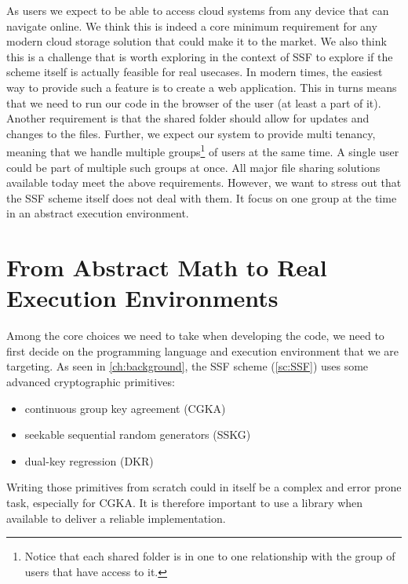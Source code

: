 As users we expect to be able to access 
cloud systems from any device that can navigate online.
We think this is indeed a core minimum requirement for any modern
cloud storage solution that could make it to the market.
We also think this is a challenge that is worth exploring
in the context of SSF to explore if the scheme itself is
actually feasible for real usecases.
In modern times, the easiest way
to provide such a feature is to create a web application.
This in turns means that we need to run our code in the
browser of the user (at least a part of it).
Another requirement is that the shared folder should
allow for updates and changes to the files.
Further, we expect our system to provide multi tenancy,
meaning that we handle multiple groups\footnote{Notice that each shared folder is in one to one relationship with the group of users that have access to it.}
of users at the same time. 
A single user could be part of multiple such groups at once. 
All major file sharing solutions available today meet the above requirements.
However, we want to stress out that the SSF scheme itself does not deal with them.
It focus on one group at the time in an abstract execution
environment.

\section{From Abstract Math to Real Execution Environments}\label{sc:abstract-to-real}

Among the core choices we need to take when developing
the code, we need to first
decide on the programming language and execution
environment that we are targeting.
As seen in \cref{ch:background}, the SSF scheme (\cref{sc:SSF})
uses some advanced cryptographic primitives:
\begin{itemize}
    \item continuous group key agreement (CGKA)
    \item seekable sequential random generators (SSKG)
    \item dual-key regression (DKR)
\end{itemize}
Writing those primitives from scratch could in itself
be a complex and error prone task, especially for CGKA.
It is therefore important to use a library when available
to deliver a reliable implementation.

